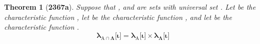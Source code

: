\documentclass[preview]{standalone}
\newtheorem*{theorem*}{Theorem}
\begin{document}
\begin{theorem*}[\textbf{2367a}]
    Suppose that , and \bm{$\Lambda$} are sets with universal set \bm{$\Omega$}. 
    Let  be the characteristic function 
    , 
    let  be the characteristic function 
    ,
    and let \bm{$\lambda_{\Lambda}$} be the characteristic function  
    .
    \begin{equation*}
        \bm{
            \lambda_{\mathrm{A} \cap \Lambda}\big[ \iota \big] 
                = 
            \lambda_{\mathrm{A}}\big[ \iota \big] 
                \times 
            \lambda_{\Lambda}\big[ \iota \big]
            }
    \end{equation*}
\end{theorem*}
\end{document}
